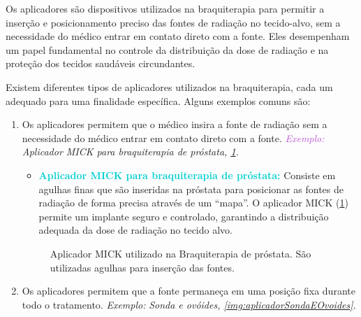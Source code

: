 \documentclass[11pt,a4paper]{article}
\newcounter{exemplo}
\begin{document}
			
		Os aplicadores são dispositivos utilizados na braquiterapia para permitir a inserção e posicionamento preciso das fontes de radiação no tecido-alvo, sem a necessidade do médico entrar em contato direto com a fonte. Eles desempenham um papel fundamental no controle da distribuição da dose de radiação e na proteção dos tecidos saudáveis circundantes.

		Existem diferentes tipos de aplicadores utilizados na braquiterapia, cada um adequado para uma finalidade específica. Alguns exemplos comuns são:

			\begin{enumerate}
				\item Os aplicadores permitem que o médico insira a fonte de radiação sem a necessidade do médico entrar em contato direto com a fonte. \textit{\textcolor{MediumOrchid}{Exemplo:}} \textit{Aplicador MICK para braquiterapia de próstata,  \ref{img:aplicadorMick}.}
					
				\begin{itemize}[label=\textcolor{CarnationPink}{$\star$}]
						\item \textcolor{DarkTurquoise}{\textbf{Aplicador MICK para braquiterapia de próstata:}} Consiste em agulhas finas que são inseridas na próstata para posicionar as fontes de radiação de forma precisa através de um ``mapa''. O aplicador MICK (\ref{img:aplicadorMick}) permite um implante seguro e controlado, garantindo a distribuição adequada da dose de radiação no tecido alvo.
					\end{itemize}

					\begin{figure}[h]
						\centering
						\caption{Aplicador MICK utilizado na Braquiterapia de próstata. São utilizadas agulhas para inserção das fontes.}
						\label{img:aplicadorMick}
					\end{figure}
				
				\item Os aplicadores permitem que a fonte permaneça em uma posição fixa durante todo o tratamento. \textit{\textcolor{CarnationPink}{Exemplo:}} \textit{Sonda e ovóides,    \ref{img:aplicadorSondaEOvoides}.}
				

\end{enumerate}
\end{document}
